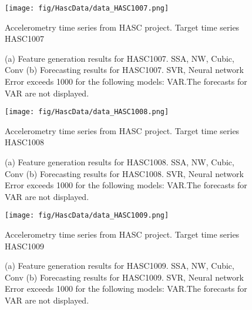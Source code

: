 \documentclass[12pt]{article}
\begin{document}
\begin{figure}
\centering
\texttt{[image: fig/HascData/data\_HASC1007.png]}
\caption{Accelerometry time series from HASC project. Target time series	HASC1007	}
\end{figure}


\begin{figure}
\centering
{}
\caption{(a)	Feature generation results for	HASC1007.	SSA, NW, Cubic, Conv	(b)	Forecasting results for	HASC1007.	SVR, Neural network	Error exceeds 1000 for the following models: VAR.The forecasts for VAR are not displayed.	}
\end{figure}


\begin{figure}
\centering
\texttt{[image: fig/HascData/data\_HASC1008.png]}
\caption{Accelerometry time series from HASC project. Target time series	HASC1008	}
\end{figure}


\begin{figure}
\centering
{}
\caption{(a)	Feature generation results for	HASC1008.	SSA, NW, Cubic, Conv	(b)	Forecasting results for	HASC1008.	SVR, Neural network	Error exceeds 1000 for the following models: VAR.The forecasts for VAR are not displayed.	}
\end{figure}


\begin{figure}
\centering
\texttt{[image: fig/HascData/data\_HASC1009.png]}
\caption{Accelerometry time series from HASC project. Target time series	HASC1009	}
\end{figure}


\begin{figure}
\centering
{}
\caption{(a)	Feature generation results for	HASC1009.	SSA, NW, Cubic, Conv	(b)	Forecasting results for	HASC1009.	SVR, Neural network	Error exceeds 1000 for the following models: VAR.The forecasts for VAR are not displayed.	}
\end{figure}
\end{document}
